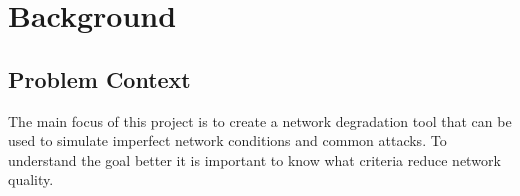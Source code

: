 


\chapter{Background}

\section{Problem Context}

The main focus of this project is to create a network degradation tool that can be used to simulate imperfect network conditions and common attacks. To understand the goal better it is important to know what criteria reduce network quality.

